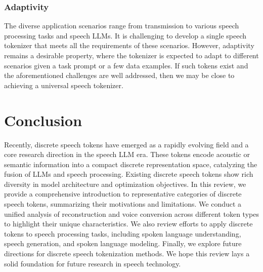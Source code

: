 \vspace{0.05in}
\subsubsection{Adaptivity}
The diverse application scenarios range from transmission to various speech processing tasks and speech LLMs.
It is challenging to develop a single speech tokenizer that meets all the requirements of these scenarios.
However, adaptivity remains a desirable property, where the tokenizer is expected to adapt to different scenarios given a task prompt or a few data examples.
If such tokens exist and the aforementioned challenges are well addressed, then we may be close to achieving a universal speech tokenizer.

\vspace{-0.07in}
\section{Conclusion}
Recently, discrete speech tokens have emerged as a rapidly evolving field and a core research direction in the speech LLM era. These tokens encode acoustic or semantic information into a compact discrete representation space, catalyzing the fusion of LLMs and speech processing.
Existing discrete speech tokens show rich diversity in model architecture and optimization objectives.
In this review, we provide a comprehensive introduction to representative categories of discrete speech tokens, summarizing their motivations and limitations. 
We conduct a unified analysis of reconstruction and voice conversion across different token types to highlight their unique characteristics. 
We also review efforts to apply discrete tokens to speech processing tasks, including spoken language understanding, speech generation, and spoken language modeling. 
Finally, we explore future directions for discrete speech tokenization methods. 
We hope this review lays a solid foundation for future research in speech technology.
